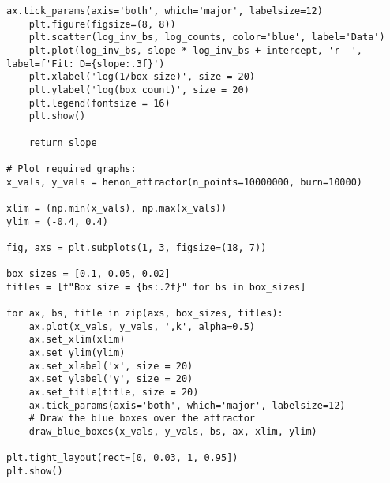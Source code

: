 \begin{lstlisting}[style=python]
    ax.tick_params(axis='both', which='major', labelsize=12)
    plt.figure(figsize=(8, 8))
    plt.scatter(log_inv_bs, log_counts, color='blue', label='Data')
    plt.plot(log_inv_bs, slope * log_inv_bs + intercept, 'r--', label=f'Fit: D={slope:.3f}')
    plt.xlabel('log(1/box size)', size = 20)
    plt.ylabel('log(box count)', size = 20)
    plt.legend(fontsize = 16)
    plt.show()
    
    return slope

# Plot required graphs:
x_vals, y_vals = henon_attractor(n_points=10000000, burn=10000)

xlim = (np.min(x_vals), np.max(x_vals))
ylim = (-0.4, 0.4)

fig, axs = plt.subplots(1, 3, figsize=(18, 7))

box_sizes = [0.1, 0.05, 0.02]
titles = [f"Box size = {bs:.2f}" for bs in box_sizes]

for ax, bs, title in zip(axs, box_sizes, titles):
    ax.plot(x_vals, y_vals, ',k', alpha=0.5)
    ax.set_xlim(xlim)
    ax.set_ylim(ylim)
    ax.set_xlabel('x', size = 20)
    ax.set_ylabel('y', size = 20)
    ax.set_title(title, size = 20)
    ax.tick_params(axis='both', which='major', labelsize=12)
    # Draw the blue boxes over the attractor
    draw_blue_boxes(x_vals, y_vals, bs, ax, xlim, ylim)

plt.tight_layout(rect=[0, 0.03, 1, 0.95])
plt.show()
\end{lstlisting}\label{boxalg}